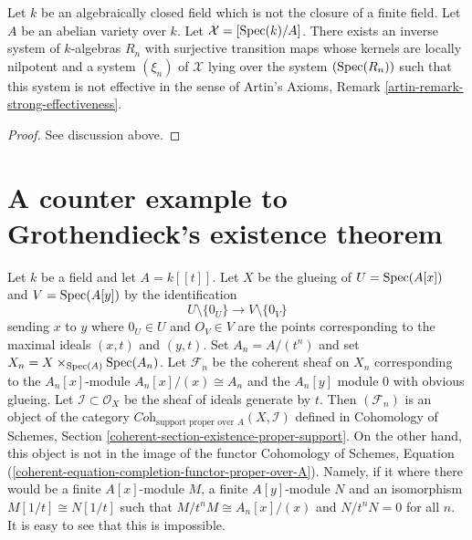 \begin{lemma}
\label{lemma-non-formal-effectiveness}
Let $k$ be an algebraically closed field which is not the closure
of a finite field. Let $A$ be an abelian variety over $k$.
Let $\mathcal{X} = [\mathop{\mathrm{Spec}}(k)/A]$.
There exists an inverse system of $k$-algebras $R_n$
with surjective transition maps whose kernels are locally nilpotent
and a system $(\xi_n)$ of $\mathcal{X}$ lying over the system
$(\mathop{\mathrm{Spec}}(R_n))$ such that this system is not effective
in the sense of Artin's Axioms, Remark \ref{artin-remark-strong-effectiveness}.
\end{lemma}

\begin{proof}
See discussion above.
\end{proof}








\section{A counter example to Grothendieck's existence theorem}
\label{section-Grothendieck-existence}

\noindent
Let $k$ be a field and let $A = k[[t]]$. Let $X$ be the glueing of
$U = \mathop{\mathrm{Spec}}(A[x])$ and $V = \mathop{\mathrm{Spec}}(A[y])$ by the identification
$$
U \setminus \{0_U\} \longrightarrow V \setminus \{0_V\}
$$
sending $x$ to $y$ where $0_U \in U$ and $O_V \in V$ are the points
corresponding to the maximal ideals $(x, t)$ and $(y, t)$. Set
$A_n = A/(t^n)$ and set $X_n = X \times_{\mathop{\mathrm{Spec}}(A)} \mathop{\mathrm{Spec}}(A_n)$.
Let $\mathcal{F}_n$ be the coherent sheaf on $X_n$
corresponding to the $A_n[x]$-module $A_n[x]/(x) \cong A_n$
and the $A_n[y]$ module $0$ with obvious glueing.
Let $\mathcal{I} \subset \mathcal{O}_X$ be the sheaf of
ideals generate by $t$. Then $(\mathcal{F}_n)$ is an object of
the category $\textit{Coh}_{\text{support proper over } A}(X, \mathcal{I})$
defined in
Cohomology of Schemes, Section \ref{coherent-section-existence-proper-support}.
On the other hand, this object is not in the image of
the functor
Cohomology of Schemes,
Equation (\ref{coherent-equation-completion-functor-proper-over-A}).
Namely, if it where there would be a finite $A[x]$-module $M$,
a finite $A[y]$-module $N$ and an isomorphism $M[1/t] \cong N[1/t]$
such that $M/t^nM \cong A_n[x]/(x)$ and $N/t^nN = 0$ for all $n$.
It is easy to see that this is impossible.

